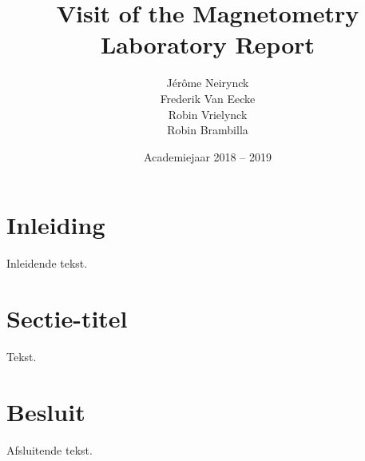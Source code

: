 \documentclass[a4paper,kulak]{kulakarticle} %
\date{Academiejaar 2018 -- 2019}
\title{Visit of the Magnetometry Laboratory
	Report}
\author{Jérôme Neirynck\\ Frederik Van Eecke\\ Robin Vrielynck\\ Robin Brambilla}
\begin{document}
\maketitle

\section*{Inleiding}

Inleidende tekst.

\section{Sectie-titel}

Tekst.

\section*{Besluit}

Afsluitende tekst.
\end{document}
